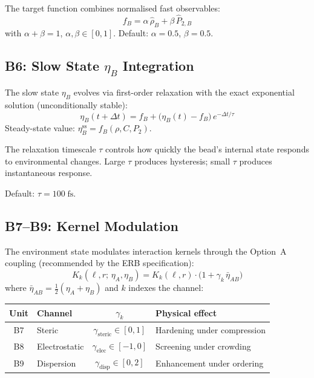 \documentclass[11pt, a4paper, oneside]{article}
\begin{document}
The target function combines normalised fast observables:
%
\begin{equation}
  f_B = \alpha\,\hat{\rho}_B + \beta\,\hat{P}_{2,B}
  \label{eq:target}
\end{equation}
%
with $\alpha + \beta = 1$, $\alpha,\beta \in [0,1]$.
Default: $\alpha = 0.5$, $\beta = 0.5$.

\subsection{B6: Slow State \texorpdfstring{$\eta_B$}{etaB} Integration}
\label{sec:b6-eta}

The slow state $\eta_B$ evolves via first-order relaxation with the
exact exponential solution (unconditionally stable):
%
\begin{equation}
  \boxed{
    \eta_B(t + \Delta t) = f_B + \bigl(\eta_B(t) - f_B\bigr)\,
    e^{-\Delta t / \tau}
  }
  \label{eq:eta-exact}
\end{equation}
%
Steady-state value: $\eta_B^{\text{ss}} = f_B(\rho, C, P_2)$.

The relaxation timescale $\tau$ controls how quickly the bead's
internal state responds to environmental changes.  Large $\tau$
produces hysteresis; small $\tau$ produces instantaneous response.

Default: $\tau = 100\;\text{fs}$.

\subsection{B7--B9: Kernel Modulation}
\label{sec:b7-b9-modulation}

The environment state modulates interaction kernels through the
Option~A coupling (recommended by the ERB specification):
%
\begin{equation}
  K_k(\ell, r;\, \eta_A, \eta_B)
  = K_k(\ell, r) \cdot
  \bigl(1 + \gamma_k\,\bar{\eta}_{AB}\bigr)
  \label{eq:modulation}
\end{equation}
%
where $\bar{\eta}_{AB} = \tfrac{1}{2}(\eta_A + \eta_B)$ and $k$
indexes the channel:

\begin{center}
\begin{tabular}{clcl}
  \toprule
  \textbf{Unit} & \textbf{Channel} & $\gamma_k$ & \textbf{Physical effect} \\
  \midrule
  B7 & Steric        & $\gamma_{\text{steric}} \in [0, 1]$    & Hardening under compression \\
  B8 & Electrostatic & $\gamma_{\text{elec}} \in [-1, 0]$     & Screening under crowding \\
  B9 & Dispersion    & $\gamma_{\text{disp}} \in [0, 2]$      & Enhancement under ordering \\
  \bottomrule
\end{tabular}
\end{center}
\end{document}
